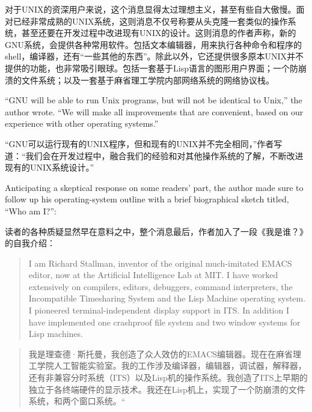\ifdefined\chs
对于UNIX的资深用户来说，这个消息显得太过理想主义，甚至有些自大傲慢。面对已经非常成熟的UNIX系统，这则消息不仅号称要从头克隆一套类似的操作系统，甚至还要在开发过程中改进现有UNIX的设计。这则消息的作者声称，新的GNU系统，会提供各种常用软件。包括文本编辑器，用来执行各种命令和程序的shell，编译器，还有“一些其他的东西”。除此以外，它还提供很多原本UNIX并不提供的功能，也非常吸引眼球。包括一套基于Lisp语言的图形用户界面；一个防崩溃的文件系统；以及一套基于麻省理工学院内部网络系统的网络协议栈。
\fi

\ifdefined\eng
``GNU will be able to run Unix programs, but will not be identical to Unix,'' the author wrote. ``We will make all improvements that are convenient, based on our experience with other operating systems.''
\fi

\ifdefined\chs
“GNU可以运行现有的UNIX程序，但和现有的UNIX并不完全相同，”作者写道：“我们会在开发过程中，融合我们的经验和对其他操作系统的了解，不断改进现有的UNIX系统设计。”
\fi

\ifdefined\eng
Anticipating a skeptical response on some readers' part, the author made sure to follow up his operating-system outline with a brief biographical sketch titled, ``Who am I?'':
\fi

\ifdefined\chs
读者的各种质疑显然早在意料之中，整个消息最后，作者加入了一段《我是谁？》的自我介绍：
\fi

\ifdefined\eng
\begin{quote}
I am Richard Stallman, inventor of the original much-imitated EMACS editor, now at the Artificial Intelligence Lab at MIT. I have worked extensively on compilers, editors, debuggers, command interpreters, the Incompatible Timesharing System and the Lisp Machine operating system. I pioneered terminal-independent display support in ITS. In addition I have implemented one crashproof file system and two window systems for Lisp machines.
\end{quote}
\fi

\ifdefined\chs
\begin{quote}
我是理查德·斯托曼，我创造了众人效仿的EMACS编辑器。现在在麻省理工学院人工智能实验室。我的工作涉及编译器，编辑器，调试器，解释器，还有非兼容分时系统（ITS）以及Lisp机的操作系统。我创造了ITS上早期的独立于各终端硬件的显示技术。我还在Lisp机上，实现了一个防崩溃的文件系统，和两个窗口系统。“
\end{quote}
\fi

